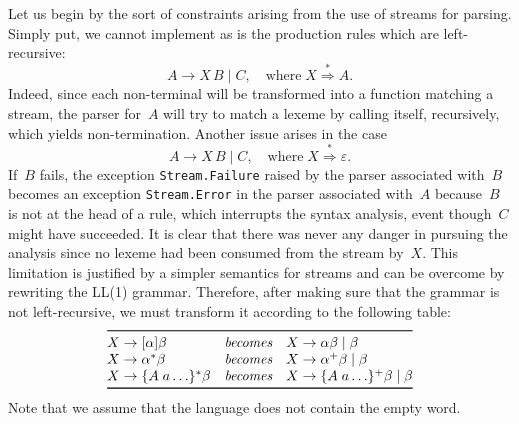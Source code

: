 Let us begin by the sort of constraints arising from the use of
streams for parsing. Simply put, we cannot implement as is the
production rules which are left\hyp{}recursive:
\begin{equation*}
A \rightarrow X \, B \mid C, \quad \text{where} \; X
\stackrel{*}{\Rightarrow} A.
\end{equation*}
Indeed, since each non\hyp{}terminal will be transformed into a
function matching a stream, the parser for~\(A\) will try to match a
lexeme by calling itself, recursively, which yields
non\hyp{}termination. Another issue arises in the case
\begin{equation*}
A \rightarrow X \, B \mid C, \quad \text{where} \; X
\stackrel{*}{\Rightarrow} \varepsilon.
\end{equation*}
If~\(B\) fails, the exception \texttt{Stream.Failure} raised by the
parser associated with~\(B\) becomes an exception
\texttt{Stream.Error} in the parser associated with~\(A\)
because~\(B\) is not at the head of a rule, which interrupts the
syntax analysis, event though~\(C\) might have succeeded. It is clear
that there was never any danger in pursuing the analysis since no
lexeme had been consumed from the stream by~\(X\). This limitation is
justified by a simpler semantics for streams and can be overcome by
rewriting the LL(1) grammar. Therefore, after making sure that the
grammar is not left\hyp{}recursive, we must transform it according to
the following table:
\begin{equation*}
\begin{array}{@{}lcl@{}}
\toprule
  X \rightarrow [\alpha] \beta
& \textit{becomes} 
& X \rightarrow \alpha \beta \mid \beta\\
  X \rightarrow \alpha^* \beta
& \textit{becomes}
& X \rightarrow \alpha^+ \beta \mid \beta\\
  X \rightarrow \{A \; a \ldots\}^* \beta
& \textit{becomes}
& X \rightarrow \{A \; a \ldots\}^+ \beta \mid \beta\\
\bottomrule
\end{array}
\end{equation*}
Note that we assume that the language does not contain the empty word.

